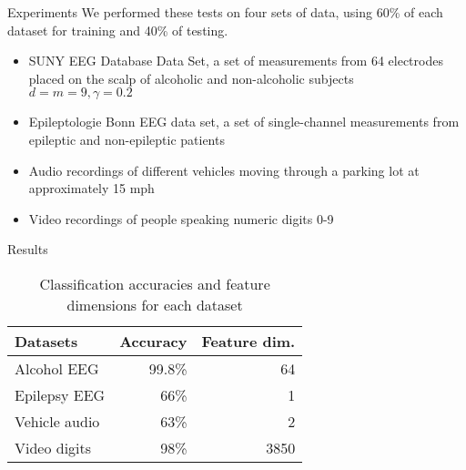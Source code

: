 \documentclass[final]{beamer}
\newlength{\onecolwid}
\begin{document}
\begin{frame}[t]
\begin{columns}[t]
\begin{column}{\onecolwid}
\begin{block}{Experiments}
    We performed these tests on four sets of data, using 60\% of each dataset for training and 40\%
    of testing.
    \begin{itemize}
        \item SUNY EEG Database Data Set, a set of measurements from 64 electrodes placed on
            the scalp of alcoholic and non-alcoholic subjects \cite{zhang_event_1995} \\
            $d = m = 9, \gamma = 0.2$
        \item Epileptologie Bonn EEG data set, a set of single-channel measurements from epileptic
            and non-epileptic patients \cite{andrzejak_indications_2001}
        \item Audio recordings of different vehicles moving through a parking lot at approximately
            15 mph \cite{sunu_dimensionality_2018}
        \item Video recordings of people speaking numeric digits 0-9 \cite{lieu_signal_2011}
    \end{itemize}
\end{block}


\begin{block}{Results}
    \begin{table}
        \begin{tabular}{l r r}
            \toprule
            \textbf{Datasets} & Accuracy & Feature dim. \\
            \midrule
            Alcohol EEG   & 99.8\% & 64 \\
            Epilepsy EEG  & 66\%   & 1 \\
            Vehicle audio & 63\%   & 2 \\
            Video digits  & 98\%   & 3850 \\
            \bottomrule
        \end{tabular}
        \caption{Classification accuracies and feature dimensions for each dataset}
        \label{results}
    \end{table}
\end{block}


\end{column} %


\end{columns}
\end{frame}
\end{document}
